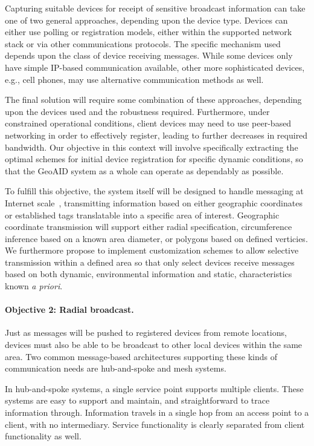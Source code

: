 \documentclass{sbir}
\begin{document}
Capturing suitable devices for receipt of sensitive broadcast information can take one of two general approaches, depending upon the device type. Devices can either use polling or registration models, either within the supported network stack or via other communications protocols. The specific mechanism used depends upon the class of device receiving messages. While some devices only have simple IP-based communication available, other more sophisticated devices, e.g., cell phones, may use alternative communication methods as well. 

The final solution will require some combination of these approaches, depending upon the devices used and the robustness required. Furthermore, under constrained operational conditions, client devices may need to use peer-based networking in order to effectively register, leading to further decreases in required bandwidth. Our objective in this context will involve specifically extracting the optimal schemes for initial device registration for specific dynamic conditions, so that the GeoAID system as a whole can operate as dependably as possible.

To fulfill this objective, the system itself will be designed to handle messaging at Internet scale~\cite{KrPaFrMa:12,LiPoClGePrNuRo:12,LlFrKaAn:11}, transmitting information based on either geographic coordinates or established tags translatable into a specific area of interest. Geographic coordinate transmission will support either radial specification, circumference inference based on a known area diameter, or polygons based on defined verticies. We furthermore propose to implement customization schemes to allow selective transmission within a defined area so that only select devices receive messages based on both dynamic, environmental information and static, characteristics known {\sl a priori}.

\paragraph{Objective 2: Radial broadcast.} Just as messages will be pushed to registered devices from remote locations, devices must also be able to be broadcast to other local devices within the same area. Two common message-based architectures supporting these kinds of communication needs are hub-and-spoke and mesh systems.

In hub-and-spoke systems, a single service point supports multiple clients. These systems are easy to support and maintain, and straightforward to trace information through. Information travels in a single hop from an access point to a client, with no intermediary. Service functionality is clearly separated from client functionality as well.
\end{document}

